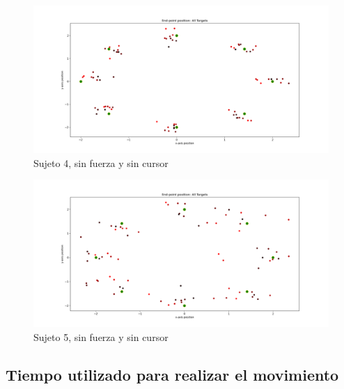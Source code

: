 \documentclass[a4paper,11pt, oneside]{book}
\begin{document}
\begin{figure}[H]
	\includegraphics[width=\linewidth]{sujeto4/no_force_no_cursor/trayectorias_puntos}
	\caption{Sujeto 4, sin  fuerza y sin cursor}
	\label{4-3-2}
\end{figure}
\begin{figure}[H]
	\includegraphics[width=\linewidth]{sujeto5/no_force_no_cursor/trayectorias_puntos}
	\caption{Sujeto 5, sin  fuerza y sin cursor}
	\label{5-3-2}
\end{figure}


\subsection{Tiempo utilizado para realizar el movimiento}
\label{anexo:6}
\end{document}
